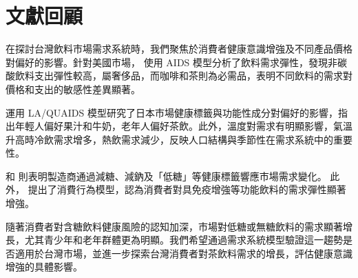 \section{文獻回顧}






在探討台灣飲料市場需求系統時，我們聚焦於消費者健康意識增強及不同產品價格對偏好的影響。針對美國市場，\citet{RN2} 使用 AIDS 模型分析了飲料需求彈性，發現非碳酸飲料支出彈性較高，屬奢侈品，而咖啡和茶則為必需品，表明不同飲料的需求對價格和支出的敏感性差異顯著。

\citet{RN1} 運用 LA/QUAIDS 模型研究了日本市場健康標籤與功能性成分對偏好的影響，指出年輕人偏好果汁和牛奶，老年人偏好茶飲。此外，溫度對需求有明顯影響，氣溫升高時冷飲需求增多，熱飲需求減少，反映人口結構與季節性在需求系統中的重要性。

\citet{RN9} 和\citet{RN3} 則表明製造商通過減糖、減鈉及「低糖」等健康標籤響應市場需求變化。
此外，\citet{Rn15} 提出了消費行為模型，認為消費者對具免疫增強等功能飲料的需求彈性顯著增強。

隨著消費者對含糖飲料健康風險的認知加深，市場對低糖或無糖飲料的需求顯著增長，尤其青少年和老年群體更為明顯\citep{RN3}。我們希望通過需求系統模型驗證這一趨勢是否適用於台灣市場，並進一步探索台灣消費者對茶飲料需求的增長，評估健康意識增強的具體影響。

